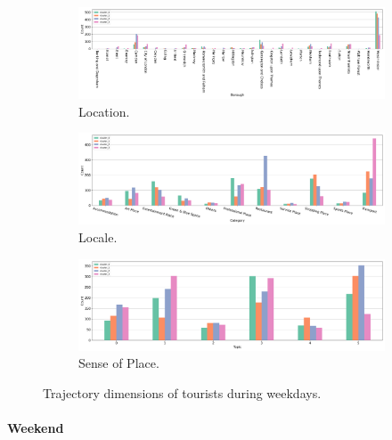 \documentclass{article}
\newcommand{\subsubsubsection}[1]{\paragraph{#1}\mbox{}\\}
\theoremstyle{definition}
\theoremstyle{remark}
\begin{document}
\begin{figure}[!h]

\centering
\begin{subfigure}{0.6\textheight}
\centering
\includegraphics[width=1\linewidth]{figures/traj_location_weekday_tourists.png}
\caption{Location.}
\label{fig:traj_location_weekday_tourists}
\end{subfigure}
\begin{subfigure}{0.6\textheight}
\centering
\includegraphics[width=1\linewidth]{figures/traj_locale_weekday_tourists.png}
\caption{Locale.}
\label{fig:traj_locale_weekday_tourists}
\end{subfigure}
\begin{subfigure}{0.6\textheight}
\centering
\includegraphics[width=1\linewidth]{figures/traj_sense_weekday_tourists.png}
\caption{Sense of Place.}
\label{fig:traj_sense_weekday_tourists}
\end{subfigure}

\caption{Trajectory dimensions of tourists during weekdays.}
\label{fig:traj_dimension_weekday_tourists}
\end{figure}


\subsubsubsection{Weekend}
\end{document}
